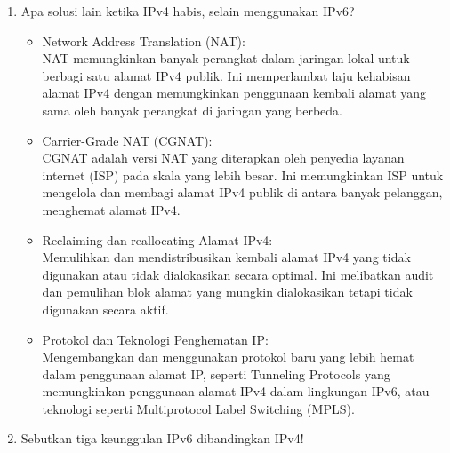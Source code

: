 \begin{enumerate}
	\item Apa solusi lain ketika IPv4 habis, selain menggunakan IPv6?
	
	\begin{itemize}
		\item Network Address Translation (NAT): \\ NAT memungkinkan banyak perangkat dalam jaringan lokal untuk berbagi satu alamat IPv4 publik. Ini memperlambat laju kehabisan alamat IPv4 dengan memungkinkan penggunaan kembali alamat yang sama oleh banyak perangkat di jaringan yang berbeda.
		\item Carrier-Grade NAT (CGNAT): \\ CGNAT adalah versi NAT yang diterapkan oleh penyedia layanan internet (ISP) pada skala yang lebih besar. Ini memungkinkan ISP untuk mengelola dan membagi alamat IPv4 publik di antara banyak pelanggan, menghemat alamat IPv4.
		\item Reclaiming dan reallocating Alamat IPv4: \\ Memulihkan dan mendistribusikan kembali alamat IPv4 yang tidak digunakan atau tidak dialokasikan secara optimal. Ini melibatkan audit dan pemulihan blok alamat yang mungkin dialokasikan tetapi tidak digunakan secara aktif.
		\item Protokol dan Teknologi Penghematan IP: \\ Mengembangkan dan menggunakan protokol baru yang lebih hemat dalam penggunaan alamat IP, seperti Tunneling Protocols yang memungkinkan penggunaan alamat IPv4 dalam lingkungan IPv6, atau teknologi seperti Multiprotocol Label Switching (MPLS).
	\end{itemize}

	\item Sebutkan tiga keunggulan IPv6 dibandingkan IPv4!
	

\end{enumerate}
